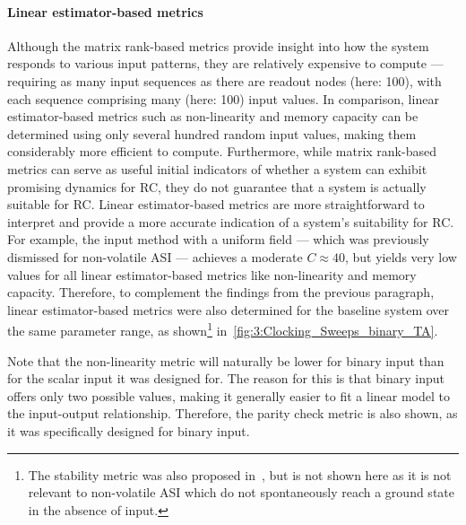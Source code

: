 \paragraph{Linear estimator-based metrics}
Although the matrix rank-based metrics provide insight into how the system responds to various input patterns, they are relatively expensive to compute --- requiring as many input sequences as there are readout nodes (here: 100), with each sequence comprising many (here: 100) input values.
In comparison, linear estimator-based metrics such as non-linearity and memory capacity can be determined using only several hundred random input values, making them considerably more efficient to compute.
Furthermore, while matrix rank-based metrics can serve as useful initial indicators of whether a system can exhibit promising dynamics for RC, they do not guarantee that a system is actually suitable for RC.
Linear estimator-based metrics are more straightforward to interpret and provide a more accurate indication of a system's suitability for RC.
For example, the input method with a uniform field --- which was previously dismissed for non-volatile ASI --- achieves a moderate $C \approx 40$, but yields very low values for all linear estimator-based metrics like non-linearity and memory capacity. %
Therefore, to complement the findings from the previous paragraph, linear estimator-based metrics were also determined for the baseline system over the same parameter range, as shown\footnote{
	The stability metric was also proposed in~\cite{RC_TaskAgnosticMetrics_v2}, but is not shown here as it is not relevant to non-volatile ASI which do not spontaneously reach a ground state in the absence of input.
} in~\cref{fig:3:Clocking_Sweeps_binary_TA}. \par
Note that the non-linearity metric will naturally be lower for binary input than for the scalar input it was designed for.
The reason for this is that binary input offers only two possible values, making it generally easier to fit a linear model to the input-output relationship.
Therefore, the parity check metric is also shown, as it was specifically designed for binary input. %


